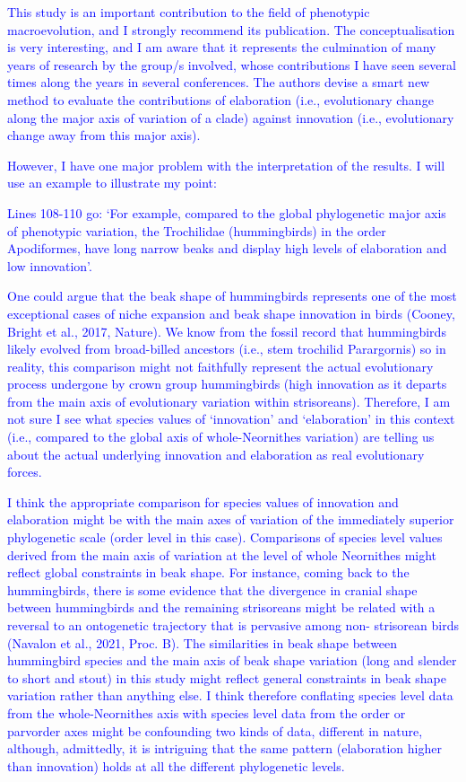 \documentclass[12pt,letterpaper]{article}
\begin{document}
\textcolor{blue}{This study is an important contribution to the field of phenotypic macroevolution, and I strongly recommend its publication. The conceptualisation is very interesting, and I am aware that it represents the culmination of many years of research by the group/s involved, whose contributions I have seen several times along the years in several conferences. The authors devise a smart new method to evaluate the contributions of elaboration (i.e., evolutionary change along the major axis of variation of a clade) against innovation (i.e., evolutionary change away from this major axis).}

\textcolor{blue}{However, I have one major problem with the interpretation of the results. I will use an example to illustrate my point:}

\textcolor{blue}{Lines 108-110 go: ‘For example, compared to the global phylogenetic major axis of phenotypic variation, the Trochilidae (hummingbirds) in the order Apodiformes, have long narrow beaks and display high levels of elaboration and low innovation’.}

\textcolor{blue}{One could argue that the beak shape of hummingbirds represents one of the most exceptional cases of niche expansion and beak shape innovation in birds (Cooney, Bright et al., 2017, Nature). We know from the fossil record that hummingbirds likely evolved from broad-billed ancestors (i.e., stem trochilid Parargornis) so in reality, this comparison might not faithfully represent the actual evolutionary process undergone by crown group hummingbirds (high innovation as it departs from the main axis of evolutionary variation within strisoreans). Therefore, I am not sure I see what species values of ‘innovation’ and ‘elaboration’ in this context (i.e., compared to the global axis of whole-Neornithes variation) are telling us about the actual underlying innovation and elaboration as real evolutionary forces.}

\textcolor{blue}{I think the appropriate comparison for species values of innovation and elaboration might be with the main axes of variation of the immediately superior phylogenetic scale (order level in this case). Comparisons of species level values derived from the main axis of variation at the level of whole Neornithes might reflect global constraints in beak shape. For instance, coming back to the hummingbirds, there is some evidence that the divergence in cranial shape between hummingbirds and the remaining strisoreans might be related with a reversal to an ontogenetic trajectory that is pervasive among non- strisorean birds (Navalon et al., 2021, Proc. B). The similarities in beak shape between hummingbird species and the main axis of beak shape variation (long and slender to short and stout) in this study might reflect general constraints in beak shape variation rather than anything else. I think therefore conflating species level data from the whole-Neornithes axis with species level data from the order or parvorder axes might be confounding two kinds of data, different in nature, although, admittedly, it is intriguing that the same pattern (elaboration higher than innovation) holds at all the different phylogenetic levels.}
\end{document}
